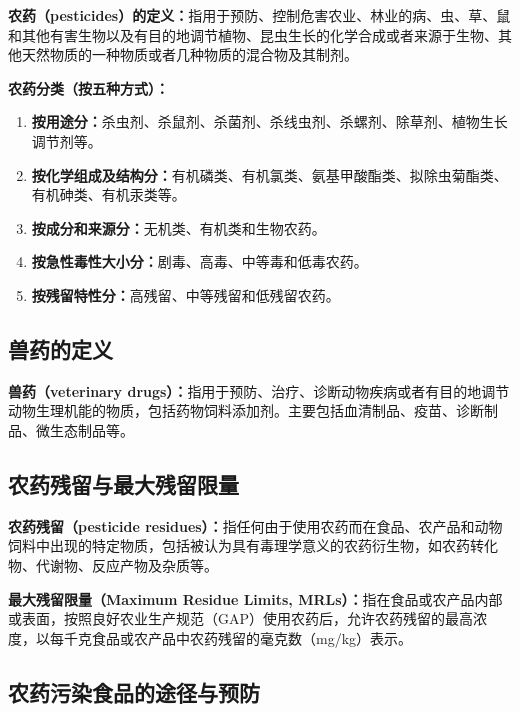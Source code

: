 \begin{keybox}
\textbf{农药（pesticides）的定义：}指用于预防、控制危害农业、林业的病、虫、草、鼠和其他有害生物以及有目的地调节植物、昆虫生长的化学合成或者来源于生物、其他天然物质的一种物质或者几种物质的混合物及其制剂。

\textbf{农药分类（按五种方式）：}
\begin{enumerate}[leftmargin=*]
    \item \textbf{按用途分：}杀虫剂、杀鼠剂、杀菌剂、杀线虫剂、杀螺剂、除草剂、植物生长调节剂等。
    \item \textbf{按化学组成及结构分：}有机磷类、有机氯类、氨基甲酸酯类、拟除虫菊酯类、有机砷类、有机汞类等。
    \item \textbf{按成分和来源分：}无机类、有机类和生物农药。
    \item \textbf{按急性毒性大小分：}剧毒、高毒、中等毒和低毒农药。
    \item \textbf{按残留特性分：}高残留、中等残留和低残留农药。
\end{enumerate}
\end{keybox}

\subsection{兽药的定义}

\begin{defbox}
\textbf{兽药（veterinary drugs）：}指用于预防、治疗、诊断动物疾病或者有目的地调节动物生理机能的物质，包括药物饲料添加剂。主要包括血清制品、疫苗、诊断制品、微生态制品等。
\end{defbox}

\subsection{农药残留与最大残留限量}

\begin{keybox}
\textbf{农药残留（pesticide residues）：}指任何由于使用农药而在食品、农产品和动物饲料中出现的特定物质，包括被认为具有毒理学意义的农药衍生物，如农药转化物、代谢物、反应产物及杂质等。

\textbf{最大残留限量（Maximum Residue Limits, MRLs）：}指在食品或农产品内部或表面，按照良好农业生产规范（GAP）使用农药后，允许农药残留的最高浓度，以每千克食品或农产品中农药残留的毫克数（mg/kg）表示。
\end{keybox}

\subsection{农药污染食品的途径与预防}

